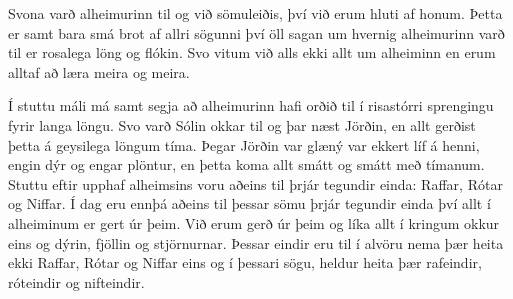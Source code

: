 \documentclass[ebook,11pt,oneside,openany]{memoir}
\begin{document}
\bigskip

Svona varð alheimurinn til og við sömuleiðis, því við erum hluti af honum. Þetta er samt bara smá brot af allri sögunni því öll sagan um hvernig alheimurinn varð til er rosalega löng og flókin. Svo vitum við alls ekki allt um alheiminn en erum alltaf að læra meira og meira.

Í stuttu máli má samt segja að alheimurinn hafi orðið til í risastórri sprengingu fyrir langa löngu. Svo varð Sólin okkar til og þar næst Jörðin, en allt gerðist þetta á geysilega löngum tíma. Þegar Jörðin var glæný var ekkert líf á henni, engin dýr og engar plöntur, en þetta koma allt smátt og smátt með tímanum. Stuttu eftir upphaf alheimsins voru aðeins til þrjár tegundir einda: Raffar, Rótar og Niffar. Í dag eru ennþá aðeins til þessar sömu þrjár tegundir einda því allt í alheiminum er gert úr þeim. Við erum gerð úr þeim og líka allt í kringum okkur eins og dýrin, fjöllin og stjörnurnar. Þessar eindir eru til í alvöru nema þær heita ekki Raffar, Rótar og Niffar eins og í þessari sögu, heldur heita þær rafeindir, róteindir og nifteindir.


\newpage 
\pagestyle{empty}

\theendnotes
\end{document}
